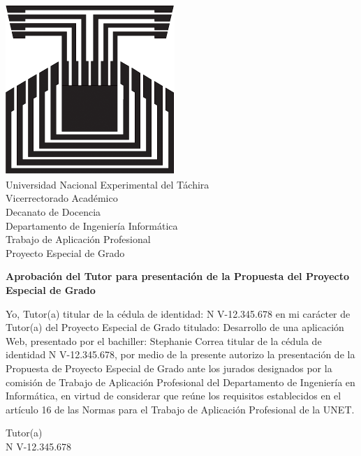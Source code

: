\chapter*{}
\pagestyle{empty}
\thispagestyle{empty}

\begin{center}
\vspace*{-4cm}
\includegraphics[scale=0.2]{unet.jpg}\\

Universidad Nacional Experimental del T\'achira\\
Vicerrectorado Acad\'emico\\
Decanato de Docencia\\
Departamento de Ingenier\'ia Inform\'atica\\
Trabajo de Aplicaci\'on Profesional\\
Proyecto Especial de Grado\\

\end{center}
\vspace*{2cm}
\begin{center}
\textbf{Aprobaci\'on del Tutor para presentaci\'on de la Propuesta del Proyecto Especial de Grado}
\end{center}
\vspace*{1cm}

	Yo, Tutor(a) titular de la c\'edula de identidad: N V-12.345.678 en mi car\'acter de Tutor(a) del Proyecto Especial de Grado titulado: Desarrollo de una aplicaci\'on Web, presentado por el bachiller: Stephanie Correa titular de la c\'edula de identidad N V-12.345.678, por medio de la presente autorizo la presentaci\'on de la Propuesta de Proyecto Especial de Grado ante los jurados designados por la comisi\'on de Trabajo de Aplicaci\'on Profesional del Departamento de Ingenier\'ia en Inform\'atica, en virtud de considerar que re\'une los requisitos establecidos en el art\'iculo 16 de las Normas para el Trabajo de Aplicaci\'on Profesional de la UNET.\\
	
	\vspace*{2cm}
	\begin{center}
	Tutor(a)\\
	
	N V-12.345.678
	\end{center}